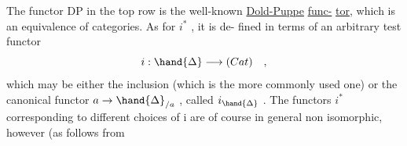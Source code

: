 The functor DP in the top row is the well-known \uline{Dold-Puppe} \uline{func-}%
\uline{tor}, which is an equivalence of categories. As for $i^*$ , it is de-%
fined in terms of an arbitrary test functor
\[ i : \hand{\Delta} \longrightarrow (Cat) \quad , \]
which may be either the  inclusion (which is the more commonly
used one) or the canonical functor $a \to \hand{\Delta}_{/a}$ , called $i_{\hand{\Delta}}$ . The
functors $i^*$ corresponding to different choices of i are of course
in general non isomorphic, however (as follows from  

